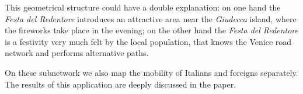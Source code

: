 \documentclass{standalone}
\begin{document}
This geometrical structure could have a double explanation: on one hand the \emph{Festa del Redentore} introduces an attractive area near the \emph{Giudecca} island, where the fireworks take place in the evening; on the other hand the \emph{Festa del Redentore} is a festivity very much felt by the local population, that knows the Venice road network and performs alternative paths.

On these subnetwork we also map the mobility of Italians and foreigns separately.
The results of this application are deeply discussed in the paper.
\end{document}
